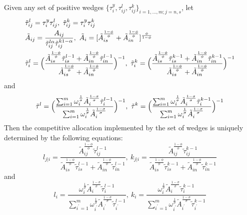 \documentclass{article}
\begin{document}
\begin{prop}
    Given any set of positive wedges $\{ \tau_i^y, \tau_{ij}^l, \tau_{ij}^k\}_{i=1,\dots,m; j=n,s}$, let
    \begin{align*}
        &\tilde{\tau}_{ij}^l=\tau_i^y \tau_{ij}^l,\ \tilde{\tau}_{ij}^k=\tau_i^y \tau_{ij}^k\\
        &\tilde{A}_{ij}=\frac{A_{ij}}{\tilde{\tau}_{ij}^{l\alpha} \tilde{\tau}_{ij}^{k 1-\alpha}},\ \tilde{A}_i=[\tilde{A}_{is}^{\frac{1-\phi}{\phi}}+\tilde{A}_{in}^{\frac{1-\phi}{\phi}}]^{\frac{\phi}{1-\phi}}\\
        &\tilde{\tau}_i^l=\Bigl( \frac{\tilde{A}_{is}^{\frac{1-\phi}{\phi}} \tilde{\tau}_{is}^{l-1} + \tilde{A}_{in}^{\frac{1-\phi}{\phi}} \tilde{\tau}_{in}^{l-1}}{\tilde{A}_{is}^{\frac{1-\phi}{\phi}}+\tilde{A}_{in}^{\frac{1-\phi}{\phi}}} \Bigr)^{-1},\ \tilde{\tau}_i^k=\Bigl( \frac{\tilde{A}_{is}^{\frac{1-\phi}{\phi}} \tilde{\tau}_{is}^{k-1} + \tilde{A}_{in}^{\frac{1-\phi}{\phi}} \tilde{\tau}_{in}^{k-1}}{\tilde{A}_{is}^{\frac{1-\phi}{\phi}}+\tilde{A}_{in}^{\frac{1-\phi}{\phi}}} \Bigr)^{-1}
    \end{align*}
    and
    \begin{equation*}
        \tilde{\tau}^l= \Bigl( \frac{\sum_{i=1}^m \omega_i^{\frac{1}{\sigma}} \tilde{A}_i^{\frac{1-\sigma}{\sigma}} \tilde{\tau}_i^{l-1}}{\sum_{i=1}^m \omega_i^{\frac{1}{\sigma}} \tilde{A}_i^{\frac{1-\sigma}{\sigma}}} \Bigr)^{-1},\ \tilde{\tau}^k= \Bigl( \frac{\sum_{i=1}^m \omega_i^{\frac{1}{\sigma}} \tilde{A}_i^{\frac{1-\sigma}{\sigma}} \tilde{\tau}_i^{k-1}}{\sum_{i=1}^m \omega_i^{\frac{1}{\sigma}} \tilde{A}_i^{\frac{1-\sigma}{\sigma}}} \Bigr)^{-1}
    \end{equation*}
    Then the competitive allocation implemented by the set of wedges is uniquely determined by the following equations:
    \begin{equation*}
        l_{j|i}=\frac{\tilde{A}_{ij}^{\frac{1-\phi}{\phi}} \tilde{\tau}_{ij}^{l-1}}{\tilde{A}_{is}^{\frac{1-\phi}{\phi}} \tilde{\tau}_{is}^{l-1} + \tilde{A}_{in}^{\frac{1-\phi}{\phi}} \tilde{\tau}_{in}^{l-1}},\ k_{j|i}=\frac{\tilde{A}_{ij}^{\frac{1-\phi}{\phi}} \tilde{\tau}_{ij}^{k-1}}{\tilde{A}_{is}^{\frac{1-\phi}{\phi}} \tilde{\tau}_{is}^{k-1} + \tilde{A}_{in}^{\frac{1-\phi}{\phi}} \tilde{\tau}_{in}^{k-1}}
    \end{equation*}
    and
    \begin{equation*}
        l_i=\frac{\omega_i^{\frac{1}{\sigma}} \tilde{A}_i^{\frac{1-\sigma}{\sigma}} \tilde{\tau}_i^{l-1}}{\sum_{i^\prime=1}^m \omega_{i^\prime}^{\frac{1}{\sigma}} \tilde{A}_{i^\prime}^{\frac{1-\sigma}{\sigma}} \tilde{\tau}_{i^\prime}^{l-1}},\  k_i=\frac{\omega_i^{\frac{1}{\sigma}} \tilde{A}_i^{\frac{1-\sigma}{\sigma}} \tilde{\tau}_i^{k-1}}{\sum_{i^\prime=1}^m \omega_{i^\prime}^{\frac{1}{\sigma}} \tilde{A}_{i^\prime}^{\frac{1-\sigma}{\sigma}} \tilde{\tau}_{i^\prime}^{k-1}}

\end{equation*}
\end{prop}
\end{document}
